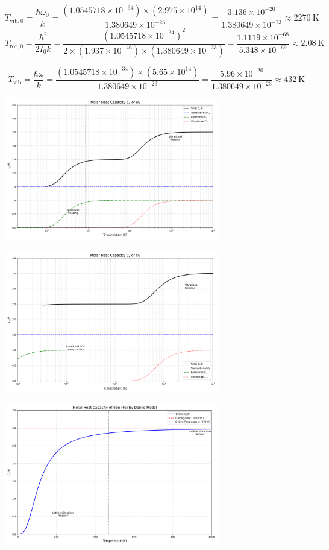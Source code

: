 \documentclass[a4paper]{article}
\begin{document}
\textbf{}

\[
T_{\text{vib},0} = \frac{\hbar \omega_0}{k} 
= \frac{(1.0545718 \times 10^{-34}) \times (2.975 \times 10^{14})}{1.380649 \times 10^{-23}} 
= \frac{3.136 \times 10^{-20}}{1.380649 \times 10^{-23}} 
\approx \SI{2270}{\kelvin}
\]
\[
T_{\text{rot},0} = \frac{\hbar^2}{2I_0 k} 
= \frac{(1.0545718 \times 10^{-34})^2}{2 \times (1.937 \times 10^{-46}) \times (1.380649 \times 10^{-23})} 
= \frac{1.1119 \times 10^{-68}}{5.348 \times 10^{-69}} 
\approx \SI{2.08}{\kelvin}
\]

\textbf{}

\[
T_{\text{vib}} = \frac{\hbar \omega}{k} 
= \frac{(1.0545718 \times 10^{-34}) \times (5.65 \times 10^{14})}{1.380649 \times 10^{-23}} 
= \frac{5.96 \times 10^{-20}}{1.380649 \times 10^{-23}} 
\approx \SI{432}{\kelvin}
\]

\newpage

\begin{center}
    \includegraphics[width=0.7\textwidth]{H2D.png}
\end{center}

\begin{center}
    \includegraphics[width=0.7\textwidth]{O2D.png}
\end{center}

\begin{center}
    \includegraphics[width=0.7\textwidth]{FeDD.png}
\end{center}
\end{document}
